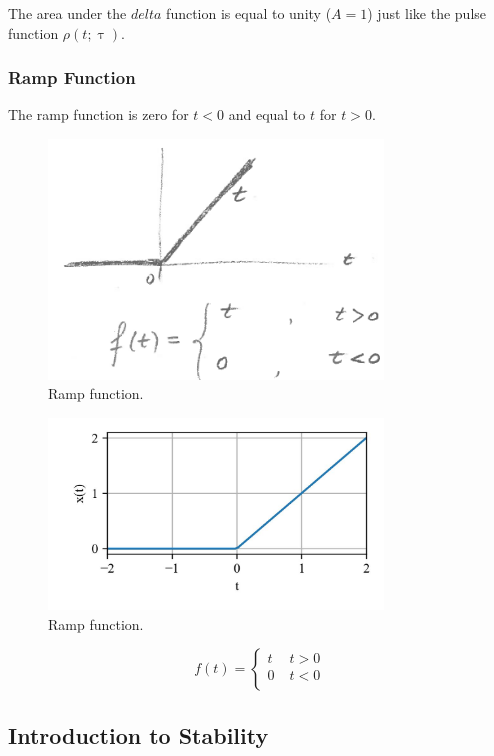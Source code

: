 \documentclass[12pt,letter]{article}
\begin{document}
The area under the $delta$ function is equal to unity ($A=1$) just like the pulse function $\rho(t;\uptau)$.

\subsubsection{Ramp Function}

The ramp function is zero for $t<0$ and equal to $t$ for $t>0$. 

\begin{figure}[H]
	\centering
	\includegraphics[width=3.5in]{../figures/ramp_function.png}
	\caption{Ramp function.}
\end{figure}

\begin{figure}[H]
	\centering
	\includegraphics[width=3.5in]{../figures/ramp_function.jpg}
	\caption{Ramp function.}
\end{figure}
		\begin{equation}
		f(t) =
			\begin{cases}
			t & \; t>0 \\
			0 & \; t<0 \\
			\end{cases}
		\end{equation}
	\subsection{Introduction to Stability}
\end{document}
